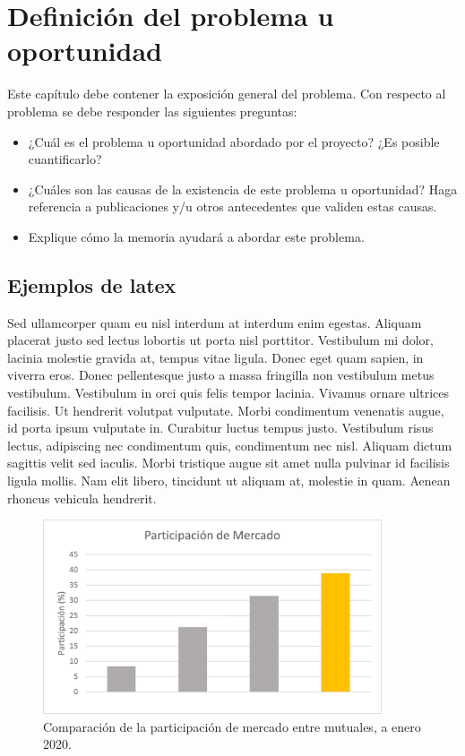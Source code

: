 \chapter{Definición del problema u oportunidad} %
\label{sec:problema} %

Este capítulo debe contener la exposición general del problema. Con respecto al problema se debe responder las siguientes preguntas:
\begin{itemize}
	\item	¿Cuál es el problema u oportunidad abordado por el proyecto? ¿Es posible cuantificarlo?
	\item	¿Cuáles son las causas de la existencia de este problema u oportunidad? Haga referencia a publicaciones y/u otros antecedentes que validen estas causas.
	\item Explique cómo la memoria ayudará a abordar este problema.
	
\end{itemize}

\section{Ejemplos de latex}

Sed ullamcorper quam eu nisl interdum at interdum enim egestas. Aliquam placerat justo sed lectus lobortis ut porta nisl porttitor. Vestibulum mi dolor, lacinia molestie gravida at, tempus vitae ligula. Donec eget quam sapien, in viverra eros. Donec pellentesque justo a massa fringilla non vestibulum metus vestibulum. Vestibulum in orci quis felis tempor lacinia. Vivamus ornare ultrices facilisis. Ut hendrerit volutpat vulputate. Morbi condimentum venenatis augue, id porta ipsum vulputate in. Curabitur luctus tempus justo. Vestibulum risus lectus, adipiscing nec condimentum quis, condimentum nec nisl. Aliquam dictum sagittis velit sed iaculis. Morbi tristique augue sit amet nulla pulvinar id facilisis ligula mollis. Nam elit libero, tincidunt ut aliquam at, molestie in quam. Aenean rhoncus vehicula hendrerit.

\begin{figure}[th]
	\centering
	\includegraphics[width=10cm]{Figures/Ejemplo}
	\caption{Comparación de la participación de mercado entre mutuales, a enero 2020.}
	\label{fig:Ejemplo}
\end{figure}

